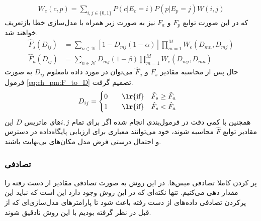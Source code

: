 \begin{equation}
	\begin{aligned}
		W_e(c,p) = \sum_{i,j \in \{0,1\}} P(c|E_c=i)P(p|E_p=j)W(i,j)
	\end{aligned}
	\label{eq:ch_pm:W_e}
\end{equation}
که در این صورت توابع $F_p$ و $F_a$ نیز به صورت زیر همراه با مدل‌سازی خطا بازتعریف خواهند شد.
\begin{equation}
	\begin{aligned}
		\hat{F}_s(D_{ij}) &= \sum_{n \in \mathcal{N}}  [1-D_{mj}(1-\alpha)]  \prod_{m=1}^{M} W_e(D_{mn}, D_{mj}) \\
		\hat{F}_a(D_{ij}) &= \sum_{n \in \mathcal{N}}  D_{mj}(1-\beta)  \prod_{m=1}^{M} W_e(D_{mj}, D_{mn})
	\end{aligned}
	\label{eq:ch_pm:F_all_final}
\end{equation}
حال پس از محاسبه مقادیر $\hat{F}_s$ و $\hat{F}_a$ می‌توان در مورد داده نامعلوم $D_{ij}$  به صورت فرمول \ref{eq:ch_pm:F_to_D} تصمیم گرفت.
\begin{equation}
	D_{ij} = \begin{cases}
		0 \qquad \text{\lr{if}} \quad \hat{F}_s \ge \hat{F}_a \\
		1 \qquad \text{\lr{if}} \quad \hat{F}_s < \hat{F}_a
	\end{cases}
	\label{eq:ch_pm:F_to_D}
\end{equation}
همچنین با کمی دقت در فرمول‌بندی انجام شده اگر برای تمام $i,j$های ماتریس $D$ این مقادیر توابع $\hat{F}$ محاسبه شوند، خود می‌توانند معیاری برای ارزیابی پایگاه‌داده در دسترس و احتمال درستی فرض مدل مکان‌های بی‌نهایت باشند.



\subsubsection{تصادفی}
پر کردن کاملا تصادفی میس‌ها. در این روش به صورت تصادفی مقادیر از دست رفته را مقدار دهی می‌کنیم. تنها نکته‌ای که در این روش وجود دارد این است که نباید این پرکردن تصادفی داده‌های از دست رفته باعث شود تا پارامترهای مدل‌سازی‌ای که از قبل در نظر گرفته بودیم با این روش نادقیق شوند.


